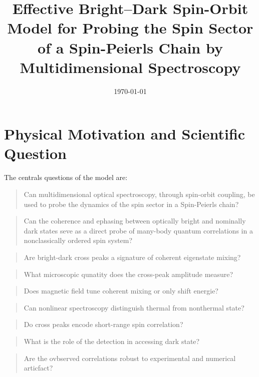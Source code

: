 \documentclass[11pt]{article}
\title{Effective Bright--Dark Spin-Orbit Model for Probing the Spin Sector of a Spin-Peierls Chain by Multidimensional Spectroscopy}
\author{}
\date{\today}
\begin{document}
\maketitle

\section{Physical Motivation and Scientific Question}

The centrals questions of the model are:
\begin{quote}
Can multidimensional optical spectroscopy, through spin-orbit coupling, be used to probe the dynamics of the spin sector in a Spin-Peierls chain?
\end{quote}

\begin{quote}
Can the coherence and ephasing between optically bright and nominally dark states seve as a direct probe of many-body quantum correlations in a nonclassically ordered spin system?
\end{quote}

\begin{quote}
Are bright-dark cross peaks a signature of coherent eigenstate mixing?
\end{quote}


\begin{quote}
What microscopic qunatity does the cross-peak amplitude measure?
\end{quote}

\begin{quote}
Does magnetic field tune coherent mixing or only shift energie?
\end{quote}

\begin{quote}Can nonlinear spectroscopy distinguish thermal from nonthermal state?

\end{quote}

\begin{quote}
Do cross peaks encode short-range spin correlation?
\end{quote}

\begin{quote}
What is the role of the detection in accessing dark state?
\end{quote}

\begin{quote}
Are the ovbserved correlations robust to experimental and numerical articfact?
\end{quote}
\end{document}
